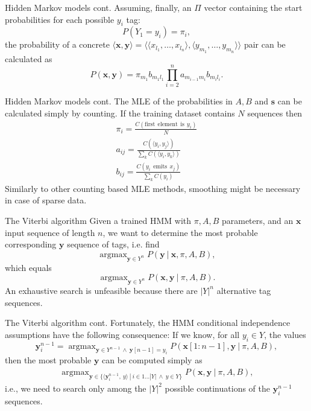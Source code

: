 \documentclass[style=upen, size=14pt]{powerdot}
\DeclareMathOperator*{\argmax}{argmax}
\theoremstyle{definition}
\begin{document}
  \begin{slide}[toc=]{Hidden Markov models cont.}
    Assuming, finally, an $\Pi$ vector containing the start probabilities
    for each possible $y_i$ tag:
    $$
    P(Y_1 = y_i) = \pi_i,
    $$
    the probability of a concrete
    $\langle \mathbf{x}, \mathbf{y} \rangle =\langle \langle
    x_{l_1},\dots,x_{l_n} \rangle, \langle y_{m_1},\dots,y_{m_n} \rangle
    \rangle$ pair can be calculated as
    $$
    P(\mathbf{x}, \mathbf{y}) = \pi_{m_1} b_{m_1 l_1}
    \prod_{i=2}^na_{m_{i-1} m_i}b_{m_i l_i}.
    $$
  \end{slide}

  \begin{slide}[toc=]{Hidden Markov models cont.} The MLE of the probabilities
    in $A, B$ and $\mathbf{s}$ can be calculated simply by counting. If the training
    dataset contains $N$ sequences then
    \begin{gather*} \pi_i = \frac{C(\mathrm{first~~element~~is~~}
        y_i)}{N}\\ a_{ij} = \frac{C(\langle y_i,y_j\rangle)}{\sum_kC(\langle
        y_i,y_k\rangle)}\\ b_{ij} = \frac{C(y_i \mathrm{~~emits~~} x_j)}{\sum_kC(y_i)}
    \end{gather*}
    Similarly to other counting based MLE methods, smoothing might be necessary
    in case of sparse data.
  \end{slide}

  \begin{slide}[toc=Viterbi]{The Viterbi algorithm}
    Given a trained HMM with $\pi, A, B$ parameters, and an $\mathbf{x}$
    input sequence of length $n$, we want to determine the most probable corresponding
    $\mathbf{y}$ sequence of tags, i.e. find
    $$
    \argmax_{\mathbf{y}\in Y^n} P(\mathbf{y} ~|~ \mathbf{x}, \pi, A, B),
    $$
    which equals
    $$
    \argmax_{\mathbf{y}\in Y^n} P(\mathbf{x}, \mathbf{y} ~|~ \pi, A, B).
    $$
    An exhaustive search is unfeasible because there are $|Y|^n$ alternative tag
    sequences.
  \end{slide}
  
  \begin{slide}[toc=]{The Viterbi algorithm cont.}
    Fortunately, the HMM conditional independence assumptions have the following
    consequence: If we know, for all $y_i\in Y$, the values
    $$
    \mathbf{y}^{n-1}_i = \argmax_{\mathbf{y}\in Y^{n-1}~\wedge~\mathbf{y}[n-1] = y_i}
    P(\mathbf{x}[1:n-1], \mathbf{y} ~|~ \pi, A, B),
    $$
    then the most probable $\mathbf{y}$ can be computed simply as 
    \begin{gather*}
      \argmax_{\mathbf{y}\in \{\langle \mathbf{y}_i^{n-1},~y \rangle ~|~ i \in 1\dots |Y|~\wedge~ y \in Y\}} P(\mathbf{x}, \mathbf{y} ~|~ \pi, A, B),
    \end{gather*}
    i.e., we need to search only among the $|Y|^2$ possible continuations of the
    $\mathbf{y}^{n-1}_i$ sequences.
  \end{slide}
\end{document}
